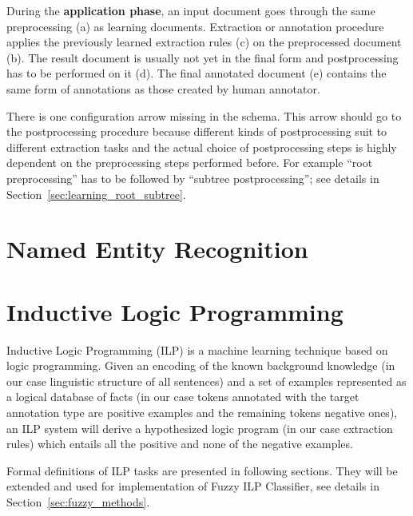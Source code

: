 During the \textbf{application phase}, an input document goes through the same preprocessing (a) as learning documents. Extraction or annotation procedure applies the previously learned extraction rules (c) on the preprocessed document (b). The result document is usually not yet in the final form and postprocessing has to be performed on it (d). The final annotated document (e) contains the same form of annotations as those created by human annotator.


There is one configuration arrow missing in the schema. This arrow should go to the postprocessing procedure because different kinds of postprocessing suit to different extraction tasks and the actual choice of postprocessing steps is highly dependent on the preprocessing steps performed before. For example ``root preprocessing'' has to be followed by ``subtree postprocessing''; see details in Section~\ref{sec:learning_root_subtree}.



\section{Named Entity Recognition} \label{sec:third_named_entity_recognition}


\section{Inductive Logic Programming} \label{sec:third_ILP}

Inductive Logic Programming (ILP) \citep{biblio:MuggletonILP} is a machine learning technique based on logic programming. Given an encoding of the known background knowledge (in our case linguistic structure of all sentences) and a set of examples represented as a logical database of facts (in our case tokens annotated with the target annotation type are positive examples and the remaining tokens negative ones), an ILP system will derive a hypothesized logic program (in our case extraction rules) which entails all the positive and none of the negative examples.

Formal definitions of ILP tasks are presented in following sections. They will be extended and used for implementation of Fuzzy ILP Classifier, see details in Section~\ref{sec:fuzzy_methods}.






